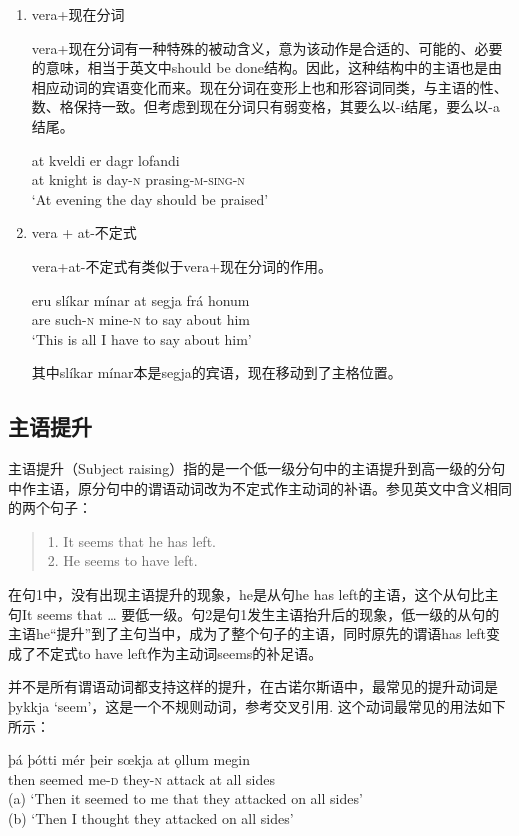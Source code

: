 \begin{enumerate}
    \item vera+现在分词

          vera+现在分词有一种特殊的被动含义，意为该动作是合适的、可能的、必要的意味，相当于英文中should be done结构。因此，这种结构中的主语也是由相应动词的宾语变化而来。现在分词在变形上也和形容词同类，与主语的性、数、格保持一致。但考虑到现在分词只有弱变格，其要么以-i结尾，要么以-a结尾。
          \begin{exe}
              \ex
              \gll at	kveldi	er	dagr	lofandi\\
              at	knight	is	day-\textsc{n}	prasing-\textsc{\MakeLowercase{M-SING-N}}\\
              \trans `At evening the day should be praised’
          \end{exe}

    \item vera + at-不定式

          vera+at-不定式有类似于vera+现在分词的作用。
          \begin{exe}
              \ex
              \gll eru	slíkar	mínar	at	segja	frá	honum\\
              are	such-\textsc{n}	mine-\textsc{n}	to	say	about	him\\
              \trans`This is all I have to say about him’
          \end{exe}

          其中slíkar mínar本是segja的宾语，现在移动到了主格位置。
\end{enumerate}

\subsection{主语提升}
主语提升（Subject raising）指的是一个低一级分句中的主语提升到高一级的分句中作主语，原分句中的谓语动词改为不定式作主动词的补语。参见英文中含义相同的两个句子：
\begin{quote}
    1. It seems that he has left.\\
    2. He seems to have left.
\end{quote}

在句1中，没有出现主语提升的现象，he是从句he has left的主语，这个从句比主句It seems that … 要低一级。句2是句1发生主语抬升后的现象，低一级的从句的主语he“提升”到了主句当中，成为了整个句子的主语，同时原先的谓语has left变成了不定式to have left作为主动词seems的补足语。

并不是所有谓语动词都支持这样的提升，在古诺尔斯语中，最常见的提升动词是þykkja `seem’，这是一个不规则动词，参考交叉引用. 这个动词最常见的用法如下所示：
\begin{exe}
    \ex
    \gll þá	þótti	mér	þeir	sœkja	at	ǫllum	megin\\
    then	seemed	me-\textsc{d}	they-\textsc{n}	attack	at	all	sides\\
    \trans (a) `Then it seemed to me that they attacked on all sides’\\
    (b) `Then I thought they attacked on all sides’
\end{exe}

